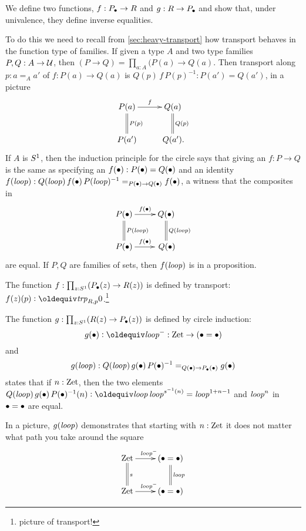 We define two functions, $f:P_\bullet\to R$ and $g:R\to P_\bullet$ and show that, under univalence, they define inverse equalities.  

To do this we need to recall from \cref{sec:heavy-transport} how transport behaves in the function type of families.  If given a type $A$ and two type families $P,Q:A\to\mathcal{U}$, then $(P\to Q)= \prod_{a:A}(P(a)\to Q(a)$.  Then transport along $p:a=_Aa'$ of $f:P(a)\to Q(a)$ is $Q(p)\,f\,P(p)^{-1}:P(a')=Q(a')$, in a picture
$$\xymatrix{
P(a)\ar[r]^{f}\ar@{=}[d]^{P(p)}&Q(a)\ar@{=}[d]^{Q(p)}\\
  P(a')&\,Q(a').}
$$
If $A$ is $S^1$, then the induction principle for the circle says that giving an $f:P\to Q$ is the same as specifying an $f(\bullet):P(\bullet)=Q(\bullet)$ and an identity $f(\mathit{loop}):Q(\mathit{loop})\,f(\bullet)\,P(\mathit{loop})^{-1}=_{P(\bullet)\to Q(\bullet)}f(\bullet)$, \ie a witness that the composites in 
$$\xymatrix{
  P(\base)\ar[r]^{f(\base)}\ar@{=}[d]^{P(\Sloop)}&Q(\base)\ar@{=}[d]^{Q(\Sloop)}\\
  P(\base)\ar[r]^{f(\base)}&\,Q(\base)}
$$
are equal.  If $P,Q$ are families of sets, then $f(\mathit{loop})$ is in a proposition.


\begin{definition}
  \label{def:fPtoR}
  The function $f:\prod_{z:S^1}(P_\bullet(z)\to R(z))$ is defined by transport: $f(z)(p)\defequi\trp_{R,p}0$.\footnote{picture of transport!}
\end{definition}
\begin{definition}
  \label{def:gRtoP}The function $g:\prod_{z:S^1}(R(z)\to P_\bullet(z))$ is defined by circle induction: 
$$g(\base)\defequi \Sloop^-:\zet\to(\base=\base)$$ and 
$$g(\mathit{loop}): Q(\mathit{loop})\, g(\bullet)\,P(\bullet)^{-1}=_{Q(\bullet)\to P_\bullet(\bullet)}g(\bullet)$$ states that if $n:\mathrm{Zet}$, then the two elements $Q(\Sloop)\, g(\base)\,P(\base)^{-1}(n)\defequi \Sloop\,\Sloop^{s^{-1}(n)}=\Sloop^{1+n-1}$ and $\mathit{loop}^n$ in $\bullet=\bullet$ are equal.
\end{definition}
In a picture, $g(\mathit{loop})$ demonstrates that starting with $n:\mathrm{Zet}$ it does not matter what path you take around the square
$$\xymatrix{\zet\ar[r]^{\Sloop^-}\ar@{=}[d]^s&(\base=\base)\ar@{=}[d]^\Sloop\\
  \zet\ar[r]^{\Sloop^-}&(\base=\base)}
$$




